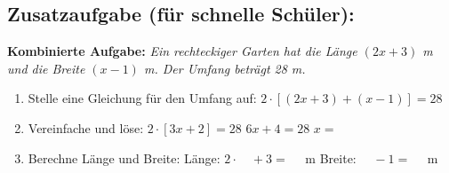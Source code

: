 \subsection*{Zusatzaufgabe (für schnelle Schüler):}

\textbf{Kombinierte Aufgabe:}
\textit{Ein rechteckiger Garten hat die Länge $(2x + 3)$ m und die Breite $(x - 1)$ m. Der Umfang beträgt 28 m.}
\vspace{0.5cm}

\begin{enumerate}[label=\alph*)]
    \item Stelle eine Gleichung für den Umfang auf:
    $2 \cdot [(2x + 3) + (x - 1)] = 28$
    \vspace{0.3cm}

    \item Vereinfache und löse:
    $2 \cdot [3x + 2] = 28$
    $6x + 4 = 28$
    $x = \phantom{00}$
    \vspace{0.3cm}

    \item Berechne Länge und Breite:
    Länge: $2 \cdot \phantom{00} + 3 = \phantom{00}$ m
    Breite: $\phantom{00} - 1 = \phantom{00}$ m
\end{enumerate}
